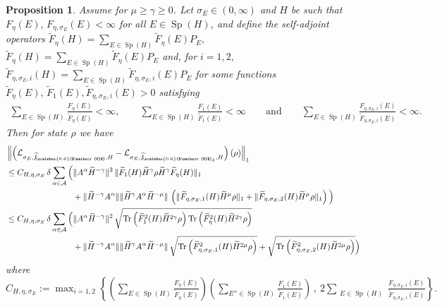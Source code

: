 \documentclass[11pt]{amsart}
\newcommand{\nn}{\nonumber}
\newcommand{\1}{\mathbbm{1}}
\newcommand{\Tr}{\operatorname{Tr}}
\newcommand{\spec}{\operatorname{Sp}}
\newcommand{\cA}{\mathcal{A}}
\newcommand{\hatfM}{\widehat{f}_{\!\scalebox{0.6}{$\mathscr{M}$}}
}
\newcommand{\hatfMdelta}{\widehat{f}_{\!\scalebox{0.6}{$\mathscr{M}$}_\delta}}
\newcommand{\bin}[1]{}
\theoremstyle{plain}
\newtheorem{proposition}[theorem]{Proposition}
\theoremstyle{definition}
\theoremstyle{remark}
\numberwithin{equation}{section}
\begin{document}
\begin{proposition}
\label{prop:DeltaTo0}
Assume  for $\mu\ge \gamma\ge 0$. Let $\sigma_E\in(0,\infty)$ and $H$ be such that $F_\eta(E),\, F_{\eta,\sigma_E}(E)<\infty$ for all $E\in\spec(H)$, and define the self-adjoint operators
$\widetilde F_\eta(H) = \sum_{E\in\spec(H)}  \widetilde F_\eta(E) P_{E},$  $\widetilde F_\eta(H) = \sum_{E\in\spec(H)}  \widetilde F_\eta(E) P_{E}$ and, for $i=1,2,$ $\widetilde F_{\eta,\sigma_E,i}(H) = \sum_{E\in\spec(H)}  \widetilde F_{\eta,\sigma_E,i}(E) P_{E}$ for some functions $\widetilde F_\eta(E),\, \widetilde F_1(E),\widetilde F_{\eta,\sigma_E,i}(E) > 0$
satisfying
\begin{align*}
    \sum_{E\in \spec(H)}\frac{F_\eta(E)}{ \widetilde F_\eta(E)}<\infty,\qquad  \sum_{E\in \spec(H)}\frac{F_1(E)}{ \widetilde F_1(E)}<\infty\qquad\text{and}\qquad    \sum_{E\in \spec(H)}\frac{F_{\eta,\sigma_E,i}(E)}{ \widetilde F_{\eta,\sigma_E,i}(E)}<\infty.
\end{align*}
Then for state $\rho$ we have 
\begin{align}
\label{eq:Deltato0}
&\left\|\left( \mathcal{L}_{\sigma_E,\hatfM,H} - \mathcal{L}_{\sigma_E,\hatfMdelta,H}\right)(\rho) \right\|_1\nn
\\&\le C_{H,\eta,\sigma_E}\,\delta 
    \sum_{\alpha\in\cA} \Big(\|A^\alpha \widetilde  H^{-\gamma}\|^2 \,
    \| \widetilde F_1(H) \widetilde H^{\gamma} \rho \widetilde H^{\gamma}\widetilde F_\eta(H) \|_1\nn
   \\&\qquad\qquad\qquad\qquad+ \|\widetilde H^{-\gamma}A^\alpha\|
      \|\widetilde H^{\gamma}A^\alpha \widetilde H^{-\mu}\|\,
      \left(\|\widetilde F_{\eta,\sigma_E,1}(H) \widetilde H^{\mu}\rho\|_1 +\|\widetilde F_{\eta,\sigma_E,2}(H) \widetilde H^{\mu}\rho\|_1\right)  
\Big) \nn\\& \le C_{H,\eta,\sigma_E}\,\delta 
    \sum_{\alpha\in\cA} \Big(\|A^\alpha \widetilde  H^{-\gamma}\|^2 \,
   \sqrt{ \Tr\left( \widetilde F^2_1(H) \widetilde H^{2\gamma}\rho\right)  \Tr\left( \widetilde F^2_\eta(H) \widetilde H^{2\gamma}\rho\right)} \nn
   \\&\qquad\qquad\qquad\qquad+ \|\widetilde H^{-\gamma}A^\alpha\|
      \|\widetilde H^{\gamma}A^\alpha \widetilde H^{-\mu}\|\,
      \sqrt{\Tr\left(\widetilde F^2_{\eta,\sigma_E,1}(H) \widetilde H^{2\mu}\rho\right)} +\sqrt{\Tr\left(\widetilde F^2_{\eta,\sigma_E,2}(H) \widetilde H^{2\mu}\rho\right)}  
\Big)
\end{align}
where $C_{H,\eta,\sigma_E}:=\max_{i=1,2}\left\{\left(\sum_{E\in\spec(H)} \tfrac{F_\eta(E)}{ \widetilde F_\eta(E)} \right)\left(\sum_{E''\in\spec(H)}\tfrac{F_1(E)}{\widetilde F_1(E)}\right)\,,\ 2\sum_{\substack{E\in\spec(H)}}\!\tfrac{F_{\eta,\sigma_E,i}(E)}{\widetilde F_{\eta,\sigma_E,i}(E)}\right\}.$ \bin{Furthermore, for $H$ having simple spectrum, the estimate \eqref{eq:Deltato0} can be improved by replacing all trace norms involving $\rho$ with operator norms.}
\end{proposition}
\end{document}
